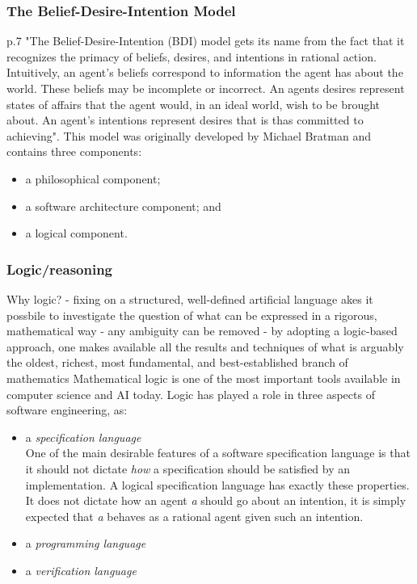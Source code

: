 \documentclass{sig-alternate-br}
\begin{document}
\subsubsection{The Belief-Desire-Intention Model} p.7
"The Belief-Desire-Intention (BDI) model gets its name from the fact that it recognizes the primacy of beliefs, desires, and intentions in rational action. Intuitively, an agent's beliefs correspond to information the agent has about the world. These beliefs may be incomplete or incorrect. An agents desires represent states of affairs that the agent would, in an ideal world, wish to be brought about. An agent's intentions represent desires that is thas committed to achieving". This model was originally developed by Michael Bratman \cite{b:ippr} and contains three components:
\begin{itemize}
\item a philosophical component;
\item a software architecture component; and
\item a logical component.
\end{itemize}
\subsubsection{Logic/reasoning}
Why logic?
- fixing on a structured, well-defined artificial language  akes it possbile to investigate the question of what can be expressed in a rigorous, mathematical way
- any ambiguity can be removed
- by adopting a logic-based approach, one makes available all the results and techniques of what is arguably the oldest, richest, most fundamental, and best-established branch of mathematics
Mathematical logic is one of the most important tools available in computer science and AI today. Logic has played a role in three aspects of software engineering, as:
\begin{itemize}
\item a {\it specification language} \\ One of the main desirable features of a software specification language is that it should not dictate {\it how} a specification should be satisfied by an implementation. A logical specification language has exactly these properties. It does not dictate how an agent {\it a} should go about an intention, it is simply expected that {\it a} behaves as a rational agent given such an intention.
\item a {\it programming language} \\
\item a {\it verification language}
\end{itemize}
\end{document}
